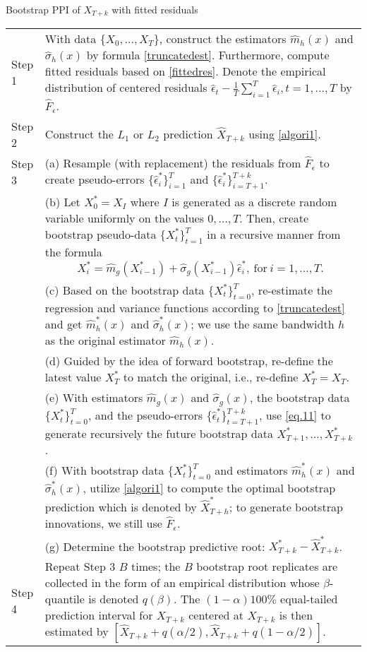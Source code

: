 \documentclass[a4paper]{article}
\begin{document}
\begin{algorithm}[H]
\caption{Bootstrap PPI of $X_{T+k}$ with fitted residuals} 
\label{algori3}
  \begin{tabularx}{\textwidth}{lX}   
    Step 1 & With data $\{X_{0},\ldots,X_{T}\}$, construct the estimators $\widehat{m}_h(x)$ and $\widehat{\sigma}_h(x)$ by formula \cref{truncatedest}. Furthermore, compute fitted residuals based on \cref{fittedres}. Denote the empirical distribution of centered residuals  $\hat{\epsilon}_t - \frac{1}{T}\sum_{i=1}^{T}\hat{\epsilon}_i, t= 1,\ldots,T$ by  $\widehat{F}_{\epsilon}$.\\
    Step 2 & Construct the   $L_1$ or $L_2$  prediction $\widehat{X}_{T+k}$ using \cref{algori1}.\\
    Step 3 & (a) Resample (with replacement) the residuals from $\widehat{F}_{\epsilon}$ to create pseudo-errors $\{\hat{\epsilon}^{*}_{i}\}_{i=1}^{T}$ and $\{\hat{\epsilon}^{*}_{i}\}_{i=T+1}^{T+k}$.\\
    &(b) Let $X_{0}^*={X}_{I}$ where $I$ is generated as a discrete random variable uniformly on the values $0,\ldots, T$. Then, create 
 bootstrap pseudo-data $\{X_t^*\}_{t = 1}^{T}$ in a recursive manner
from the formula  
 \begin{equation} \label{eq.11}
     X^*_{i} = \widehat{m}_g(X^*_{i-1}) + \widehat{\sigma}_g(X^*_{i-1})\hat{\epsilon}^*_{i},~\text{for}~i = 1,\ldots,T.
 \end{equation}
 \\
 & (c) Based on the bootstrap data $\{X^{*}_{t}\}_{t=0}^{T}$, re-estimate the regression and variance functions according to \cref{truncatedest} and get $\widehat{m}_{h}^*(x)$ and $\widehat{\sigma}_{h}^*(x)$; we use the same bandwidth $h$ as the original estimator $\widehat{m}_h(x)$.\\
 & (d) Guided by the idea of forward bootstrap, re-define the latest value $X_{T}^*$ to match the original, i.e., re-define $X_T^* = X_T$.\\
& (e) With estimators $\widehat{m}_{g}(x)$ and $\widehat{\sigma}_{g}(x)$, the bootstrap data $\{X_t^*\}_{t = 0}^{T}$, and the pseudo-errors $\{\hat{\epsilon}_{t}^*\}_{t = T+1}^{T+k}$, use \cref{eq.11} 
  to generate recursively the future bootstrap data $X_{T+1}^*,\ldots,X_{T+k}^{*}$.\\
  & (f) With bootstrap data $\{X^*_{t}\}_{t=0}^{T}$ and estimators $\widehat{m}_{h}^*(x)$ and $\widehat{\sigma}_{h}^*(x)$, utilize \cref{algori1} to compute the optimal bootstrap prediction which is denoted by $\widehat{X}^*_{T+h}$; to generate bootstrap
 innovations, we still use $\widehat{F}_{\epsilon}$.\\
& (g) Determine the bootstrap predictive root: $X_{T+k}^*- \widehat{X}^*_{T+k}$. \\ 
Step 4 & Repeat Step 3 $B$ times; 
the $B$ bootstrap root replicates are collected in the form of an empirical distribution whose $\beta$-quantile is denoted $q(\beta)$.
The $(1-\alpha)100\%$ equal-tailed prediction interval for $X_{T+k}$ centered at $\widehat{X} _{T+k}$ is then estimated by
 $[\widehat{X}_{T+k}+q(\alpha/2), \widehat{X} _{T+k}+q(1-\alpha/2)].$
  \end{tabularx}
\end{algorithm}
\end{document}
